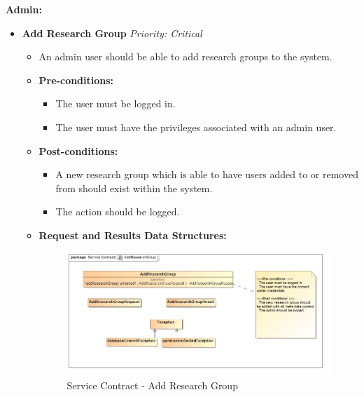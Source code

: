 \documentclass{article}
\begin{document}
				\cleardoublepage
				\textbf{Admin:}
				\begin{itemize}
					\item \textbf{Add Research Group} \hfill \textit{Priority: Critical}
					\begin{itemize}
						\item An admin user should be able to add research groups to the system.
						\item \textbf{Pre-conditions:}
						\begin{itemize}
							\item The user must be logged in.
							\item The user must have the privileges associated with an admin user.
						\end{itemize}
						\item \textbf{Post-conditions:}
						\begin{itemize}
							\item A new research group which is able to have users added to or removed from should exist within the system.
							\item The action should be logged.
						\end{itemize}
						\item \textbf{Request and Results Data Structures:}
						\begin{figure}[H]
							\includegraphics[width=\linewidth]{../Diagrams/ServiceContracts/Group control subsystem/AddResearchGroup.jpg}
							\caption{Service Contract - Add Research Group}
						\end{figure}
					\end{itemize}
					

\end{itemize}
\end{document}
